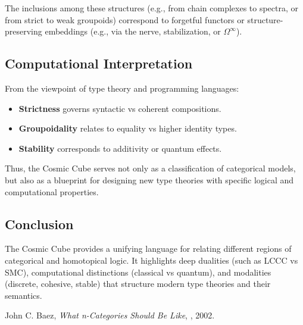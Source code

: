 \documentclass{article}
\begin{document}
The inclusions among these structures (e.g., from chain
complexes to spectra, or from strict to weak groupoids)
correspond to forgetful functors or structure-preserving
embeddings (e.g., via the nerve, stabilization, or $\Omega^\infty$).

\subsection{Computational Interpretation}

From the viewpoint of type theory and programming languages:

\begin{itemize}
\item \textbf{Strictness} governs syntactic vs coherent compositions.
\item \textbf{Groupoidality} relates to equality vs higher identity types.
\item \textbf{Stability} corresponds to additivity or quantum effects.
\end{itemize}

Thus, the Cosmic Cube serves not only as a classification of categorical models, but also as a blueprint for designing new type theories with specific logical and computational properties.

\subsection{Conclusion}

The Cosmic Cube provides a unifying language for relating different regions of categorical and homotopical logic. It highlights deep dualities (such as LCCC vs SMC), computational distinctions (classical vs quantum), and modalities (discrete, cohesive, stable) that structure modern type theories and their semantics.

\begin{thebibliography}{9}
 John C. Baez, \emph{What n-Categories Should Be Like}, , 2002.
\end{thebibliography}
\end{document}
